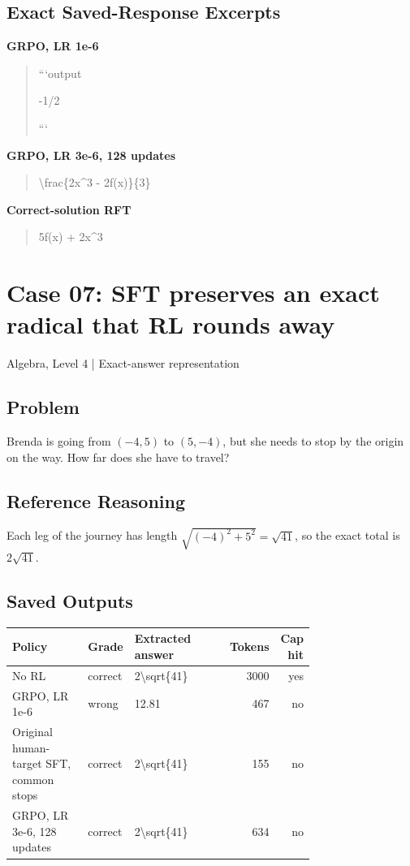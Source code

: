 \documentclass[10pt,letterpaper]{article}
\begin{document}
\subsection*{Exact Saved-Response Excerpts}
\textbf{GRPO, LR 1e-6}
\begin{quote}\small\raggedright ```output\par -1/2\par ```\end{quote}
\textbf{GRPO, LR 3e-6, 128 updates}
\begin{quote}\small\raggedright \textbackslash{}frac\{2x\textasciicircum{}3 - 2f(x)\}\{3\}\end{quote}
\textbf{Correct-solution RFT}
\begin{quote}\small\raggedright 5f(x) + 2x\textasciicircum{}3\end{quote}
\clearpage\section*{Case 07: SFT preserves an exact radical that RL rounds away}
Algebra, Level 4 | Exact-answer representation
\subsection*{Problem}
Brenda is going from $(-4,5)$ to $(5,-4)$, but she needs to stop by the origin on the way. How far does she have to travel?
\subsection*{Reference Reasoning}
Each leg of the journey has length $\sqrt{(-4)^2+5^2}=\sqrt{41}$, so the exact total is $2\sqrt{41}$.
\subsection*{Saved Outputs}
\small\begin{longtable}{p{0.29\linewidth}p{0.10\linewidth}p{0.35\linewidth}rr}\toprule Policy & Grade & Extracted answer & Tokens & Cap hit\\\midrule
No RL & correct & 2\textbackslash{}sqrt\{41\} & 3000 & yes\\
GRPO, LR 1e-6 & wrong & 12.81 & 467 & no\\
Original human-target SFT, common stops & correct & 2\textbackslash{}sqrt\{41\} & 155 & no\\
GRPO, LR 3e-6, 128 updates & correct & 2\textbackslash{}sqrt\{41\} & 634 & no\\
\bottomrule\end{longtable}\normalsize
\end{document}
